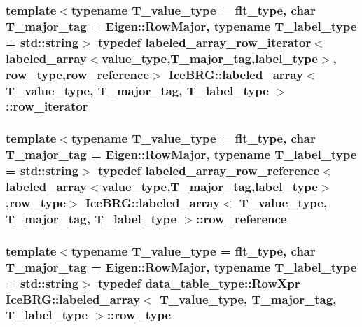 \subsubsection[{row\+\_\+iterator}]{\setlength{\rightskip}{0pt plus 5cm}template$<$typename T\+\_\+value\+\_\+type = flt\+\_\+type, char T\+\_\+major\+\_\+tag = Eigen\+::\+Row\+Major, typename T\+\_\+label\+\_\+type = std\+::string$>$ typedef {\bf labeled\+\_\+array\+\_\+row\+\_\+iterator}$<${\bf labeled\+\_\+array}$<${\bf value\+\_\+type},T\+\_\+major\+\_\+tag,{\bf label\+\_\+type}$>$, {\bf row\+\_\+type},{\bf row\+\_\+reference}$>$ {\bf Ice\+B\+R\+G\+::labeled\+\_\+array}$<$ T\+\_\+value\+\_\+type, T\+\_\+major\+\_\+tag, T\+\_\+label\+\_\+type $>$\+::{\bf row\+\_\+iterator}}\label{classIceBRG_1_1labeled__array_a53f977307768e8a9f19dae19ebfbea8c}
\hypertarget{classIceBRG_1_1labeled__array_a1bcd1efbba3ca49030c7acd8910195e6}{}
\subsubsection[{row\+\_\+reference}]{\setlength{\rightskip}{0pt plus 5cm}template$<$typename T\+\_\+value\+\_\+type = flt\+\_\+type, char T\+\_\+major\+\_\+tag = Eigen\+::\+Row\+Major, typename T\+\_\+label\+\_\+type = std\+::string$>$ typedef {\bf labeled\+\_\+array\+\_\+row\+\_\+reference}$<${\bf labeled\+\_\+array}$<${\bf value\+\_\+type},T\+\_\+major\+\_\+tag,{\bf label\+\_\+type}$>$,{\bf row\+\_\+type}$>$ {\bf Ice\+B\+R\+G\+::labeled\+\_\+array}$<$ T\+\_\+value\+\_\+type, T\+\_\+major\+\_\+tag, T\+\_\+label\+\_\+type $>$\+::{\bf row\+\_\+reference}}\label{classIceBRG_1_1labeled__array_a1bcd1efbba3ca49030c7acd8910195e6}
\hypertarget{classIceBRG_1_1labeled__array_a49606864eaff0c45136282a32dd6f44f}{}
\subsubsection[{row\+\_\+type}]{\setlength{\rightskip}{0pt plus 5cm}template$<$typename T\+\_\+value\+\_\+type = flt\+\_\+type, char T\+\_\+major\+\_\+tag = Eigen\+::\+Row\+Major, typename T\+\_\+label\+\_\+type = std\+::string$>$ typedef data\+\_\+table\+\_\+type\+::\+Row\+Xpr {\bf Ice\+B\+R\+G\+::labeled\+\_\+array}$<$ T\+\_\+value\+\_\+type, T\+\_\+major\+\_\+tag, T\+\_\+label\+\_\+type $>$\+::{\bf row\+\_\+type}}\label{classIceBRG_1_1labeled__array_a49606864eaff0c45136282a32dd6f44f}
\hypertarget{classIceBRG_1_1labeled__array_a9d293f119488089606bb583de7d22b7c}{}
